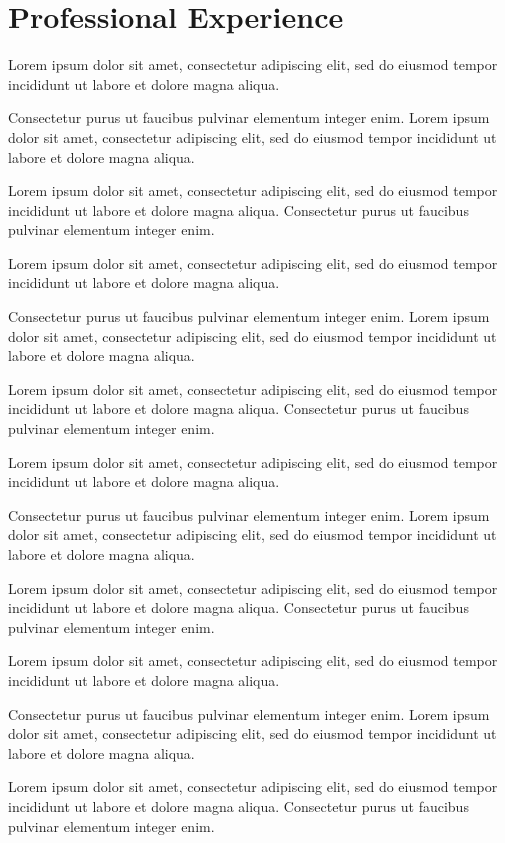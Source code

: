 \documentclass[]{resume-openfont}
\newcommand{\resumeHeading}[3]{\runsubsection{\uppercase{#1}}\descript{ | #2}\hfill\location{#3}\fakeNewLine}
\begin{document}
\section{Professional Experience}
\resumeHeading{Amazon}{Software Developer}{Apr 2014 – Aug 2023}
\begin{bullets}
    \item Lorem ipsum dolor sit amet, consectetur adipiscing elit, sed do eiusmod tempor incididunt ut labore et dolore magna aliqua.
    \item Consectetur purus ut faucibus pulvinar elementum integer enim. Lorem ipsum dolor sit amet, consectetur adipiscing elit, sed do eiusmod tempor incididunt ut labore et dolore magna aliqua. 
    \item Lorem ipsum dolor sit amet, consectetur adipiscing elit, sed do eiusmod tempor incididunt ut labore et dolore magna aliqua. Consectetur purus ut faucibus pulvinar elementum integer enim.
    \item Lorem ipsum dolor sit amet, consectetur adipiscing elit, sed do eiusmod tempor incididunt ut labore et dolore magna aliqua.
    \item Consectetur purus ut faucibus pulvinar elementum integer enim. Lorem ipsum dolor sit amet, consectetur adipiscing elit, sed do eiusmod tempor incididunt ut labore et dolore magna aliqua. 
    \item Lorem ipsum dolor sit amet, consectetur adipiscing elit, sed do eiusmod tempor incididunt ut labore et dolore magna aliqua. Consectetur purus ut faucibus pulvinar elementum integer enim.
    \item Lorem ipsum dolor sit amet, consectetur adipiscing elit, sed do eiusmod tempor incididunt ut labore et dolore magna aliqua.
    \item Consectetur purus ut faucibus pulvinar elementum integer enim. Lorem ipsum dolor sit amet, consectetur adipiscing elit, sed do eiusmod tempor incididunt ut labore et dolore magna aliqua. 
    \item Lorem ipsum dolor sit amet, consectetur adipiscing elit, sed do eiusmod tempor incididunt ut labore et dolore magna aliqua. Consectetur purus ut faucibus pulvinar elementum integer enim.
    \item Lorem ipsum dolor sit amet, consectetur adipiscing elit, sed do eiusmod tempor incididunt ut labore et dolore magna aliqua.
    \item Consectetur purus ut faucibus pulvinar elementum integer enim. Lorem ipsum dolor sit amet, consectetur adipiscing elit, sed do eiusmod tempor incididunt ut labore et dolore magna aliqua. 
    \item Lorem ipsum dolor sit amet, consectetur adipiscing elit, sed do eiusmod tempor incididunt ut labore et dolore magna aliqua. Consectetur purus ut faucibus pulvinar elementum integer enim.
\end{bullets}
\sectionsep
\end{document}

